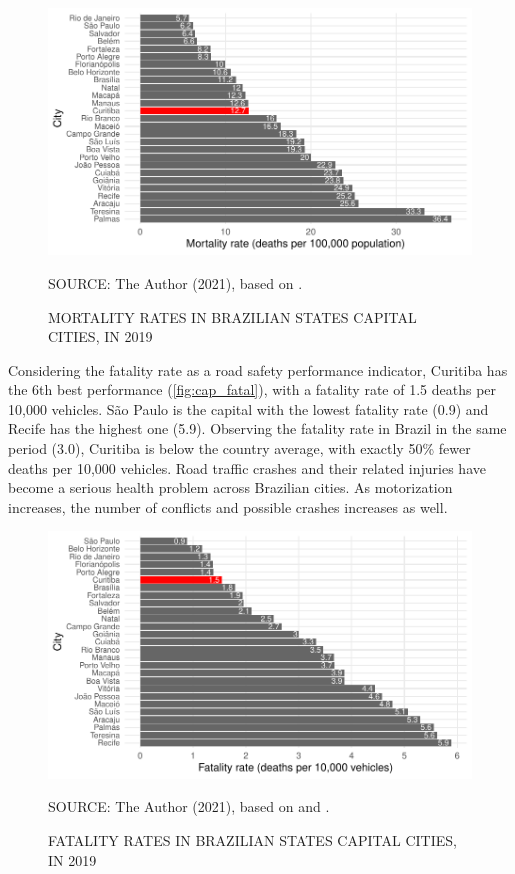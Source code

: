 \begin{figure}[!htbp]
    \centering\footnotesize
    \captionsetup{font=footnotesize}
    \caption{MORTALITY RATES IN BRAZILIAN STATES CAPITAL CITIES, IN 2019}
    \includegraphics{fig/cap_mort.pdf}
    \label{fig:cap_mort}
    \par SOURCE: The Author (2021), based on \textcite{MinistryofHealth2020,MinistryofHealth2021}.
\end{figure}  

Considering the fatality rate as a road safety performance indicator, Curitiba has the 6th best performance (\autoref{fig:cap_fatal}), with a fatality rate of 1.5 deaths per 10,000 vehicles. São Paulo is the capital with the lowest fatality rate (0.9) and Recife has the highest one (5.9). Observing the fatality rate in Brazil in the same period (3.0), Curitiba is below the country average, with exactly 50\% fewer deaths per 10,000 vehicles. Road traffic crashes and their related injuries have become a serious health problem across Brazilian cities. As motorization increases, the number of conflicts and possible crashes increases as well.

\begin{figure}[!htbp]
    \centering\footnotesize
    \captionsetup{font=footnotesize}
    \caption{FATALITY RATES IN BRAZILIAN STATES CAPITAL CITIES, IN 2019}
    \includegraphics{fig/cap_fatal.pdf}
    \label{fig:cap_fatal}
    \par SOURCE: The Author (2021), based on \textcite{MinistryofHealth2020} and \textcite{DENATRAN2020}.
\end{figure} 

